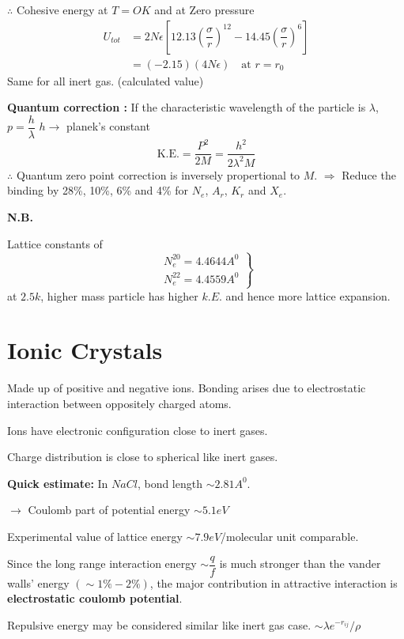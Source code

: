 $\therefore$ Cohesive energy at $T=OK$ and at Zero pressure
\begin{align*}
U_{tot} &= 2N\epsilon \left[12.13\left(\dfrac{\sigma}{r}\right)^{12}-14.45\left(\dfrac{\sigma}{r}\right)^{6}\right]\\
&= (-2.15)(4N\epsilon)\quad \text{at } r=r_{0}
\end{align*}
Same for all inert gas. (calculated value)

\noindent
{\bf Quantum correction :} If the characteristic wavelength of the particle is $\lambda$, $p=\dfrac{h}{\lambda}$ $h\to$ planek's constant
$$
\text{K.E.} = \dfrac{P^{2}}{2M}=\dfrac{h^{2}}{2\lambda^{2}M}
$$
$\therefore$ Quantum zero point correction is inversely propertional to $M$. $\Rightarrow$ Reduce the binding by 28\%, 10\%, 6\% and 4\% for $N_{e}$, $A_{r}$, $K_{r}$ and $X_{e}$.

\noindent
{\bf N.B.}

Lattice constants of
$$
\left.
\begin{array}{l}
N_{e}^{20}=4.4644A^{0}\\
N_{e}^{22}=4.4559A^{0}
\end{array}
\right\}
$$
at $2.5k$, higher mass particle has higher $k.E$. and hence more lattice expansion.

\section*{Ionic Crystals}

Made up of positive and negative ions. Bonding arises due to electrostatic interaction between oppositely charged atoms.

Ions have electronic configuration close to inert gases.

Charge distribution is close to spherical like inert gases.

\noindent
{\bf Quick estimate:} In $NaCl$, bond length $\sim 2.81A^{0}$.

$\to$ Coulomb part of potential energy $\sim 5.1 eV$

Experimental value of lattice energy $\sim 7.9 eV$/molecular unit comparable.

Since the long range interaction energy $\sim \dfrac{q}{f}$ is much stronger than the vander walls' energy $(\sim 1\%-2\%)$, the major contribution in attractive interaction is {\bf electrostatic coulomb potential}.

Repulsive energy may be considered similar like inert gas case. $\sim \lambda e^{-r_{ij}}/\rho$ 

